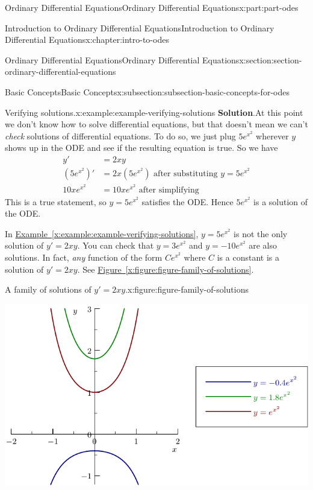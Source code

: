 \documentclass[oneside,10pt,]{book}
\newcommand{\blocktitlefont}{\relax}
\newcommand{\xreffont}{\relax}
\numberwithin{equation}{part}
\begin{document}
\begin{partptx}{Ordinary Differential Equations}{}{Ordinary Differential Equations}{}{}{x:part:part-odes}
\begin{chapterptx}{Introduction to Ordinary Differential Equations}{}{Introduction to Ordinary Differential Equations}{}{}{x:chapter:intro-to-odes}
\begin{sectionptx}{Ordinary Differential Equations}{}{Ordinary Differential Equations}{}{}{x:section:section-ordinary-differential-equations}
\begin{subsectionptx}{Basic Concepts}{}{Basic Concepts}{}{}{x:subsection:subsection-basic-concepts-for-odes}
\begin{example}{Verifying solutions.}{x:example:example-verifying-solutions}
\noindent\textbf{\blocktitlefont Solution}.\hypertarget{g:solution:idp105548778879392}{}\quad{}At this point we don't know how to solve differential equations, but that doesn't mean we can't \emph{check} solutions of differential equations. To do so, we just plug \(5e^{x^{2}}\) wherever \(y\) shows up in the ODE and see if the resulting equation is true. So we have%
\begin{align*}
y' & = 2xy \\
(5e^{x^{2}})' & = 2x(5e^{x^{2}}) \text{ after substituting }y = 5e^{x^{2}}\\
10xe^{x^{2}} & = 10xe^{x^{2}} \text{ after simplifying} 
\end{align*}
This is a true statement, so \(y = 5e^{x^{2}}\) satisfies the ODE. Hence \(5e^{x^{2}}\) is a solution of the ODE.%
\end{example}
In \hyperref[x:example:example-verifying-solutions]{Example~{\xreffont\ref{x:example:example-verifying-solutions}}}, \(y = 5e^{x^{2}}\) is not the only solution of \(y' = 2xy\). You can check that \(y = 3e^{x^{2}}\) and \(y = -10e^{x^{2}}\) are also solutions. In fact, \emph{any} function of the form \(Ce^{x^{2}}\) where \(C\) is a constant is a solution of \(y' = 2xy\). See \hyperref[x:figure:figure-family-of-solutions]{Figure~{\xreffont\ref{x:figure:figure-family-of-solutions}}}.%
\begin{figureptx}{A family of solutions of \(y' = 2xy\).}{x:figure:figure-family-of-solutions}{}%
\begin{image}{0}{1}{0}%
\includegraphics[width=\linewidth]{generated/asymptote/image-1.pdf}
\end{image}%
\tcblower
\end{figureptx}%

\end{subsectionptx}
\end{sectionptx}
\end{chapterptx}
\end{partptx}
\end{document}

